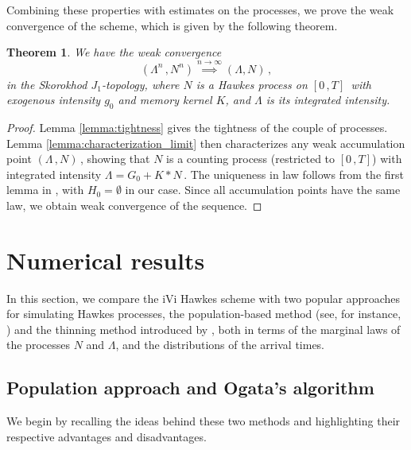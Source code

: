 \documentclass{article}
\newcommand{\1}{\mathbbm{1}}
\newtheorem{theorem}{Theorem}[section]
\numberwithin{equation}{section}
\begin{document}
Combining these properties with estimates on the processes, we prove the weak convergence of the scheme, which is given by the following theorem.
\begin{theorem}
\label{theorem:convergence}
    We have the weak convergence
    $$
    \left(\Lambda^n\,,N^n\right) \overset{n \to \infty}{\implies} \left(\Lambda, N\right)\,,
    $$
    in the Skorokhod $J_1$-topology, where $N$ is a Hawkes process on $[0\,,T]\,$ with exogenous intensity $g_0$ and memory kernel $K$, and $\Lambda$ is its integrated intensity.
\end{theorem}
\begin{proof}
Lemma \ref{lemma:tightness} gives the tightness of the couple of processes. Lemma \ref{lemma:characterization_limit} then characterizes any weak accumulation point $(\Lambda\,, N)\,$, showing that $N$ is a counting process (restricted to $[0\,,T]$) with integrated intensity $\Lambda = G_0 + K * N\,$.  The uniqueness in law follows from the first lemma in \citet{hawkes1974cluster}, with $H_0 = \emptyset$ in our case. Since all accumulation points have the same law, we obtain weak convergence of the sequence.
\end{proof}



\section{Numerical results}\label{sect:numerics}
In this section, we compare the iVi Hawkes scheme with two popular approaches for simulating Hawkes processes, the population-based method (see, for instance, \citet{Moller2005}) and the thinning method introduced by \citet{Ogata81}, both in terms of the marginal laws of the processes $N$ and $\Lambda$, and the distributions of the arrival times.

\subsection{Population approach and Ogata's algorithm}
We begin by recalling the ideas behind these two methods and highlighting their respective advantages and disadvantages.
\end{document}

